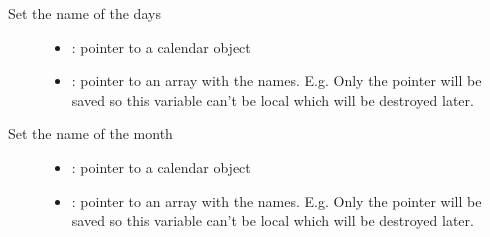 \documentclass[letterpaper,10pt,english]{sphinxmanual}
\begin{document}
\begin{fulllineitems}
\label{\detokenize{object-types/calendar:_CPPv425lv_calendar_set_day_namesP8lv_obj_tPPKc}}%
\pysigstartmultiline
{}\label{\detokenize{object-types/calendar:lv__calendar_8h_1a7ff5dee42910375c53b7e74cb08ab14c}}%
\pysigstopmultiline
Set the name of the days \begin{description}
\item[{}] \leavevmode\begin{itemize}
\item {} 
: pointer to a calendar object 

\item {} 
: pointer to an array with the names. E.g.  Only the pointer will be saved so this variable can’t be local which will be destroyed later. 

\end{itemize}

\end{description}


\end{fulllineitems}


\begin{fulllineitems}
\label{\detokenize{object-types/calendar:_CPPv427lv_calendar_set_month_namesP8lv_obj_tPPKc}}%
\pysigstartmultiline
{}\label{\detokenize{object-types/calendar:lv__calendar_8h_1a7fc39906e3e9cb174c1f6317a8921073}}%
\pysigstopmultiline
Set the name of the month \begin{description}
\item[{}] \leavevmode\begin{itemize}
\item {} 
: pointer to a calendar object 

\item {} 
: pointer to an array with the names. E.g.  Only the pointer will be saved so this variable can’t be local which will be destroyed later. 

\end{itemize}

\end{description}


\end{fulllineitems}
\end{document}
